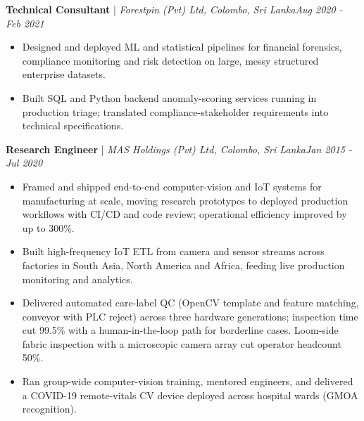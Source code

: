\documentclass[11pt]{article}
\newenvironment{cvrole}[5]{%
  \par\noindent\textbf{\large #1} | \textit{\small #2, #3}\hfill \textit{\small #4 - #5}\par
  \begin{itemize}[leftmargin=2em, itemsep=-0.3em, topsep=-0.5em]%
}{%
  \end{itemize}\par\noindent\mbox{}\par\vspace{0.1em}%
}
\begin{document}
\begin{cvrole}{Technical Consultant}{Forestpin (Pvt) Ltd}{Colombo, Sri Lanka}{Aug 2020}{Feb 2021}
    \item Designed and deployed ML and statistical pipelines for financial forensics, compliance monitoring and risk detection on large, messy structured enterprise datasets.
    \item Built SQL and Python backend anomaly-scoring services running in production triage; translated compliance-stakeholder requirements into technical specifications.
\end{cvrole}

\begin{cvrole}{Research Engineer}{MAS Holdings (Pvt) Ltd}{Colombo, Sri Lanka}{Jan 2015}{Jul 2020}
    \item Framed and shipped end-to-end computer-vision and IoT systems for manufacturing at scale, moving research prototypes to deployed production workflows with CI/CD and code review; operational efficiency improved by up to 300\%.
    \item Built high-frequency IoT ETL from camera and sensor streams across factories in South Asia, North America and Africa, feeding live production monitoring and analytics.
    \item Delivered automated care-label QC (OpenCV template and feature matching, conveyor with PLC reject) across three hardware generations; inspection time cut 99.5\% with a human-in-the-loop path for borderline cases. Loom-side fabric inspection with a microscopic camera array cut operator headcount 50\%.
    \item Ran group-wide computer-vision training, mentored engineers, and delivered a COVID-19 remote-vitals CV device deployed across hospital wards (GMOA recognition).
\end{cvrole}
\end{document}
